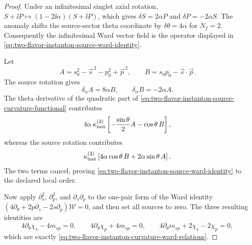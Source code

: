 \begin{proof}
Under an infinitesimal singlet axial rotation,
\(S+\ii P\mapsto (1-2\ii\alpha)(S+\ii P)\), which gives
\(\delta S=2\alpha P\) and \(\delta P=-2\alpha S\).  The anomaly shifts the
source-sector theta coordinate by \(\delta\theta=4\alpha\) for \(N_f=2\).
Consequently the infinitesimal Ward vector field is the operator displayed in
\eqref{eq:two-flavor-instanton-source-ward-identity}.

Let
\[
  A=s_0^2-\vec s^{\,2}-p_0^2+\vec p^{\,2},
  \qquad
  B=s_0p_0-\vec s\cdot\vec p .
\]
The source rotation gives
\[
  \delta_\alpha A=8\alpha B,\qquad
  \delta_\alpha B=-2\alpha A .
\]
The theta derivative of the quadratic part of
\eqref{eq:two-flavor-instanton-source-curvature-functional} contributes
\[
  4\alpha\,\kappa_{\rm inst}^{(2)}
  \left[-\frac{\sin\theta}{2}A-\cos\theta\,B\right],
\]
whereas the source rotation contributes
\[
  \kappa_{\rm inst}^{(2)}
  \left[4\alpha\cos\theta\,B+2\alpha\sin\theta\,A\right].
\]
The two terms cancel, proving
\eqref{eq:two-flavor-instanton-source-ward-identity} to the declared local
order.

Now apply \(\partial_s^2\), \(\partial_p^2\), and \(\partial_s\partial_p\) to
the one-pair form of the Ward identity
\((4\partial_\theta+2p\partial_s-2s\partial_p)\mathcal W=0\), and then set all
sources to zero.  The three resulting identities are
\[
  4\partial_\theta\chi_s-4m_{sp}=0,\qquad
  4\partial_\theta\chi_p+4m_{sp}=0,\qquad
  4\partial_\theta m_{sp}+2\chi_s-2\chi_p=0,
\]
which are exactly
\eqref{eq:two-flavor-instanton-curvature-ward-relations}.
\end{proof}

